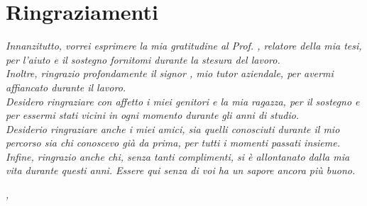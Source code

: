 \cleardoublepage
{}
{}


\bigskip

\begingroup
\let\clearpage\relax
\let\cleardoublepage\relax
\let\cleardoublepage\relax

\chapter*{Ringraziamenti}

\textit{Innanzitutto, vorrei esprimere la mia gratitudine al Prof. \myProf, relatore della mia tesi, per l'aiuto e il sostegno fornitomi durante la stesura del lavoro.}\\
\textit{Inoltre, ringrazio profondamente il signor \myTutor, mio tutor aziendale, per avermi affiancato durante il lavoro.}\\
\textit{Desidero ringraziare con affetto i miei genitori e la mia ragazza, per il sostegno e per essermi stati vicini in ogni momento durante gli anni di studio.}\\
\textit{Desiderio ringraziare anche i miei amici, sia quelli conosciuti durante il mio percorso sia chi conoscevo già da prima, per tutti i momenti passati insieme.}\\
\textit{Infine, ringrazio anche chi, senza tanti complimenti, si è allontanato dalla mia vita durante questi anni. Essere qui senza di voi ha un sapore ancora più buono.}\\
\bigskip

\noindent\textit{\myLocation, \myTime}
\hfill \myName

\endgroup
